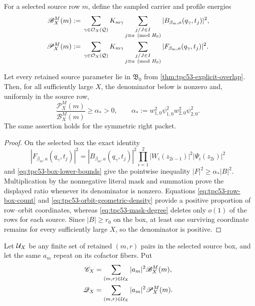 For a selected source row \(m\), define the sampled carrier and profile
energies
\begin{align}
 \mathscr B_X^M(m)
 &:={}
 \sum_{\gamma\in\mathcal O_X(\mathcal Q)}K_{m\gamma}
 \sum_{\substack{j/J\in I\\j\equiv a\pmod {H_0}}}
 |B_{\beta_m,a}(q_\gamma,t_j)|^2,
 \label{eq:tpc53-sampled-carrier}\\
 \mathscr P_X^M(m)
 &:={}
 \sum_{\gamma\in\mathcal O_X(\mathcal Q)}K_{m\gamma}
 \sum_{\substack{j/J\in I\\j\equiv a\pmod {H_0}}}
 |F_{\beta_m,a}(q_\gamma,t_j)|^2.
 \label{eq:tpc53-sampled-profile}
\end{align}

\begin{theorem}
\label{thm:tpc53-sampled-overlap}
Let every retained source parameter lie in
\(\mathfrak B_0\) from
\cref{thm:tpc53-explicit-overlap}.  Then, for all sufficiently large
\(X\), the denominator below is nonzero and, uniformly in the source
row,
\begin{equation}
 \boxed{
 \frac{\mathscr P_X^M(m)}{\mathscr B_X^M(m)}
 \ge \alpha_*>0,\qquad
 \alpha_*:=w_{1,0}^2\psi_{1,0}^2
             w_{2,0}^2\psi_{2,0}^2.}
 \label{eq:tpc53-sampled-ratio}
\end{equation}
The same assertion holds for the symmetric right packet.
\end{theorem}

\begin{proof}
On the selected box the exact identity
\[
 |F_{\beta_m,a}(q_\gamma,t_j)|^2
 =|B_{\beta_m,a}(q_\gamma,t_j)|^2
  \prod_{i=1}^2|W_i(z_{2i-1})|^2|\Psi_i(z_{2i})|^2
\]
and \eqref{eq:tpc53-box-lower-bounds} give the pointwise inequality
\(|F|^2\ge\alpha_*|B|^2\).  Multiplication by the nonnegative literal
mask and summation prove the displayed ratio whenever its denominator
is nonzero.  Equations \eqref{eq:tpc53-row-box-count} and
\eqref{eq:tpc53-orbit-geometric-density} provide a positive proportion
of row--orbit coordinates, whereas \eqref{eq:tpc53-mask-degree} deletes
only \(o(1)\) of the rows for each source.  Since
\(|B|\ge r_0\) on the box, at least one surviving coordinate remains
for every sufficiently large \(X\), so the denominator is positive.
\end{proof}

Let \(\mathcal U_X\) be any finite set of retained \((m,r)\) pairs in the
selected source box, and let the same \(a_m\) repeat on its cofactor
fibers.  Put
\begin{align}
 \mathscr C_X
 &=\sum_{(m,r)\in\mathcal U_X}|a_m|^2\mathscr B_X^M(m),
 \label{eq:tpc53-aggregate-carrier}\\
 \mathscr Q_X
 &=\sum_{(m,r)\in\mathcal U_X}|a_m|^2\mathscr P_X^M(m).
 \label{eq:tpc53-aggregate-profile}
\end{align}

